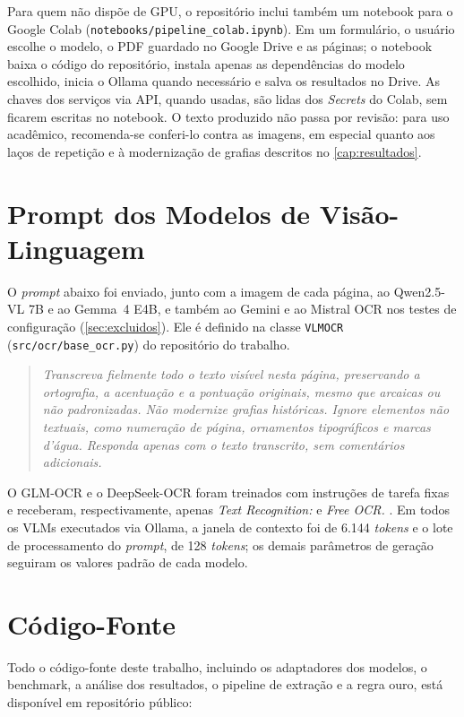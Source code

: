 \documentclass[noabntexcite,oneside]{ufsc-thesis-rn46-2019}
\begin{document}
\begin{apendicesenv}
Para quem não dispõe de GPU, o repositório inclui também um notebook para o Google Colab
(\texttt{notebooks/pipeline\_colab.ipynb}). Em um formulário, o usuário escolhe o modelo, o
PDF guardado no Google Drive e as páginas; o notebook baixa o código do repositório,
instala apenas as dependências do modelo escolhido, inicia o Ollama quando necessário e
salva os resultados no Drive. As chaves dos serviços via API, quando usadas, são lidas dos
\textit{Secrets} do Colab, sem ficarem escritas no notebook. O texto produzido não passa
por revisão: para uso acadêmico, recomenda-se conferi-lo contra as imagens, em especial
quanto aos laços de repetição e à modernização de grafias descritos no
\autoref{cap:resultados}.

\chapter{Prompt dos Modelos de Visão-Linguagem}
\label{ap:prompt}

O \textit{prompt} abaixo foi enviado, junto com a imagem de cada página, ao Qwen2.5-VL 7B e ao Gemma~4 E4B, e também ao Gemini e ao Mistral OCR nos testes
de configuração (\autoref{sec:excluidos}). Ele é definido na classe \texttt{VLMOCR}
(\texttt{src/ocr/base\_ocr.py}) do repositório do trabalho.

\begin{quote}
\itshape
Transcreva fielmente todo o texto visível nesta página, preservando a ortografia, a
acentuação e a pontuação originais, mesmo que arcaicas ou não padronizadas. Não modernize
grafias históricas. Ignore elementos não textuais, como numeração de página, ornamentos
tipográficos e marcas d'água. Responda apenas com o texto transcrito, sem comentários
adicionais.
\end{quote}

O GLM-OCR e o DeepSeek-OCR foram treinados com instruções de tarefa fixas e receberam,
respectivamente, apenas \textit{Text Recognition:} e \textit{Free OCR.}
\cite{wei2025deepseekocr}. Em todos os VLMs executados via Ollama, a janela de contexto
foi de 6.144 \textit{tokens} e o lote de processamento do \textit{prompt}, de 128
\textit{tokens}; os demais parâmetros de geração seguiram os valores padrão de cada
modelo.


\chapter{Código-Fonte}
\label{ap:codigo}

Todo o código-fonte deste trabalho, incluindo os adaptadores dos modelos, o benchmark, a
análise dos resultados, o pipeline de extração e a regra ouro, está disponível em
repositório público:


\end{apendicesenv}
\end{document}
